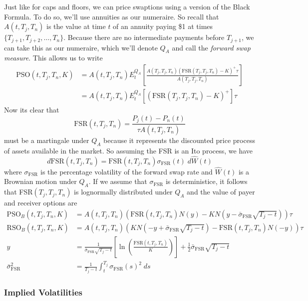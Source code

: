 \documentclass[a4paper,12pt]{scrartcl}
\begin{document}
Just like for caps and floors, we can price swaptions using a version
of the Black Formula. To do so, we'll use annuities as our
numeraire. So recall that $A(t,T_j,T_n)$ is the value at time $t$ of an 
annuity paying \$1 at times $\{T_{j+1}, T_{j+2}, \ldots, T_{n}\}$. 
Because there are no intermediate payments before $T_{j+1}$, we can
take this as our numeraire, which we'll denote $Q_A$ and call the
\emph{forward swap measure}. This allows us to write
\begin{align*}
   \text{PSO}(t,T_j,T_n,K) &= A(t,T_j,T_n) E_t^{Q_A} \left[
      \frac{A(T_j,T_j,T_n) (\text{FSR}(T_j,T_j,T_n)-K)^+ \tau}{
      A(T_j,T_j,T_n)} \right] \\
   &= A(t,T_j,T_n) E_t^{Q_A} \left[(\text{FSR}(T_j,T_j,T_n)-K)^+\right]
      \tau 
\end{align*}
Now its clear that 
   \[ \text{FSR}(t,T_j,T_n) = \frac{P_j(t) - P_n(t)}{\tau A(t,T_j,T_n)}
      \]
must be a martingale under $Q_A$ because it represents the discounted
price process of assets available in the market. So assuming the 
FSR is an Ito process, we have
   \[ d\text{FSR}(t,T_j,T_n) = \text{FSR}(t,T_j,T_n) 
      \sigma_{\text{FSR}}(t) \; d\hat{W}(t) \]
where $\sigma_{\text{FSR}}$ is the percentage volatility of the forward
swap rate and $\hat{W}(t)$ is a Brownian motion under $Q_A$. If we
assume that $\sigma_{\text{FSR}}$ is deterministice, it follows
that FSR$(T_j,T_j,T_n)$ is lognormally distributed under $Q_A$ 
and
the value of payer and receiver options are
\begin{align*}
   \text{PSO}_B(t,T_j,T_n,K) &= A(t,T_j,T_n) \left( 
      \text{FSR}(t,T_j,T_n) N(y) - K N(y - \bar{\sigma}_{\text{FSR}}
      \sqrt{T_j - t}) \right) \tau \\
   \text{RSO}_B(t,T_j,T_n,K) &= A(t,T_j,T_n) \left( 
      K N(-y + \bar{\sigma}_{\text{FSR}}\sqrt{T_j - t}) 
      - \text{FSR}(t,T_j,T_n) N(-y)\right) \tau  \\
   y &= \frac{1}{\bar{\sigma}_{\text{FSR}} \sqrt{T_j - t}} \left[
      \ln \left( \frac{\text{FSR}(t,T_j,T_n)}{K} \right) \right] + 
      \frac{1}{2} \bar{\sigma}_{\text{FSR}} \sqrt{T_j - t} \\
   \bar{\sigma}^2_{\text{FSR}} &= \frac{1}{T_j - t} \int^{T_j}_t 
      \sigma_{\text{FSR}}(s)^2 \; ds 
\end{align*}

\subsubsection{Implied Volatilities}
\end{document}
